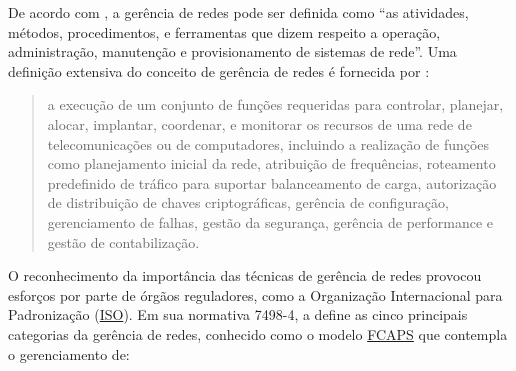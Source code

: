 \documentclass[twoside,english,brazilian]{UNISINOSmonografia}
\begin{document}
	
	De acordo com , a gerência de redes pode ser definida 
	como ``as atividades, métodos, procedimentos, e ferramentas que dizem 
	respeito a operação, administração, manutenção e provisionamento de 
	sistemas de rede''. Uma definição extensiva do conceito de gerência de 
	redes é fornecida por :
	
	\begin{quote}
		a execução de um conjunto de funções requeridas para controlar, 
		planejar, alocar, implantar, coordenar, e monitorar os recursos de uma 
		rede de telecomunicações ou de computadores, incluindo a realização de 
		funções como planejamento inicial da rede, atribuição de frequências, 
		roteamento predefinido de tráfico para suportar balanceamento de 
		carga, autorização de distribuição de chaves criptográficas, gerência 
		de configuração, gerenciamento de falhas, gestão da segurança, 
		gerência de performance e gestão de contabilização.
	\end{quote}
	
	O reconhecimento da importância das técnicas de gerência de redes provocou 
	esforços por parte de órgãos reguladores, como a Organização Internacional 
	para Padronização (\hyperref[siglas]{ISO}). Em sua normativa 7498-4, a  
	define as cinco principais categorias da gerência de redes, conhecido como 
	o modelo \hyperref[siglas]{FCAPS} que contempla o gerenciamento de:
	
\end{document}
